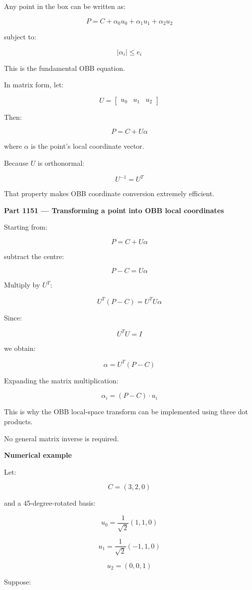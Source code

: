 Any point in the box can be written as:

\[
\boxed{ P=C+\alpha_0u_0+\alpha_1u_1+\alpha_2u_2 }
\]

subject to:

\[
|\alpha_i|\le e_i
\]

This is the fundamental OBB equation.

In matrix form, let:

\[
U= \begin{bmatrix} u_0&u_1&u_2 \end{bmatrix}
\]

Then:

\[
P=C+U\alpha
\]

where \(\alpha\) is the point's local coordinate vector.

Because \(U\) is orthonormal:

\[
\boxed{U^{-1}=U^T}
\]

That property makes OBB coordinate conversion extremely efficient.

\textbf{Part 1151 --- Transforming a point into OBB local coordinates}

Starting from:

\[
P=C+U\alpha
\]

subtract the centre:

\[
P-C=U\alpha
\]

Multiply by \(U^T\):

\[
U^T(P-C)=U^TU\alpha
\]

Since:

\[
U^TU=I
\]

we obtain:

\[
\boxed{\alpha=U^T(P-C)}
\]

Expanding the matrix multiplication:

\[
\boxed{ \alpha_i=(P-C)\cdot u_i }
\]

This is why the OBB local-space transform can be implemented using three dot products.

No general matrix inverse is required.

\textbf{Numerical example}

Let:

\[
C=(3,2,0)
\]

and a 45-degree-rotated basis:

\[
u_0=\frac{1}{\sqrt2}(1,1,0)
\]

\[
u_1=\frac{1}{\sqrt2}(-1,1,0)
\]

\[
u_2=(0,0,1)
\]

Suppose:


